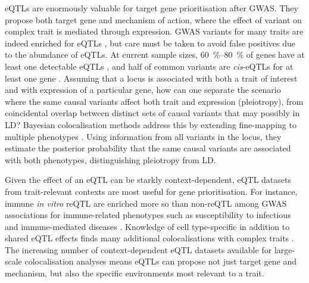 \begin{outline}
\glspl{eQTL} are enormously valuable for target gene prioritisation after \gls{GWAS}.
They propose both target gene and mechanism of action, where the effect of variant on complex trait is mediated through expression.
\Gls{GWAS} variants for many traits are indeed enriched for \glspl{eQTL} \autocite{nicolae2010TraitAssociatedSNPsAre}, but care must be taken to avoid false positives due to the abundance of \glspl{eQTL}.
At current sample sizes, \SIrange{60}{80}{\percent} of genes have at least one detectable \glspl{eQTL} \autocite{vandiedonck2017GeneticAssociationMolecular,vosa2018UnravelingPolygenicArchitecture},
and half of common variants are \textit{cis}-\glspl{eQTL} for at least one gene \autocite{liu2019AbundantAssociationsGene}.
Assuming that a locus is associated with both a trait of interest and with expression of a particular gene,
how can one separate the scenario where the same causal variants affect both trait and expression (pleiotropy),
from coincidental overlap between distinct sets of causal variants that may possibly in \gls{LD}?
Bayesian colocalisation methods address this by extending fine-mapping to multiple phenotypes \autocite{burgess2018InferringCausalRelationships,wallace2020ElicitingPriorsRelaxing,hukku2020ProbabilisticColocalizationGenetic}.
Using information from all variants in the locus, 
they estimate the posterior probability that the same causal variants are associated with both phenotypes,
distinguishing pleiotropy from \gls{LD}.

Given the effect of an \gls{eQTL} can be starkly context-dependent, 
\gls{eQTL} datasets from trait-relevant contexts are most useful for gene prioritisation.
For instance, immune \textit{in vitro} \gls{reQTL} are enriched more so than non-\gls{reQTL} among \gls{GWAS} associations for immune-related phenotypes such as
susceptibility to infectious \autocite{barreiro2012DecipheringGeneticArchitecture,manry2017DecipheringGeneticControl}
and immune-mediated diseases \autocite{manry2017DecipheringGeneticControl,kim-hellmuth2017GeneticRegulatoryEffects}.
Knowledge of cell type-specific in addition to shared \gls{eQTL} effects 
finds many additional colocalisations with complex traits \autocite{kundu2020GeneticAssociationsRegulatory,kim-hellmuth2020CellTypeSpecific}.
The increasing number of context-dependent \gls{eQTL} datasets available for large-scale colocalisation analyses means \glspl{eQTL} can propose not just target gene and mechanism, but also the specific environments most relevant to a trait.


\end{outline}
